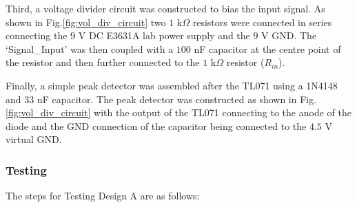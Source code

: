 Third, a voltage divider circuit was constructed to bias the input signal. As shown in Fig.\ref{fig:vol_div_circuit} two \(1\) k\(\Omega\) resistors were connected in series connecting the  \(9\) V DC E3631A lab power supply and the \(9\) V GND. The `Signal\_Input' was then coupled with a \(100\) nF capacitor at the centre point of the resistor and then further connected to the \(1\) k\(\Omega\) resistor (\(R_{in}\)).

Finally, a simple peak detector was assembled after the TL071 using a 1N4148 \cite{Vishay_1N4148} and \(33\) nF capacitor. The peak detector was constructed as shown in Fig.\ref{fig:vol_div_circuit} with the output of the TL071 connecting to the anode of the diode and the GND connection of the capacitor being connected to the \(4.5\) V virtual GND.

\subsubsection{Testing}
The steps for Testing Design A are as follows:

